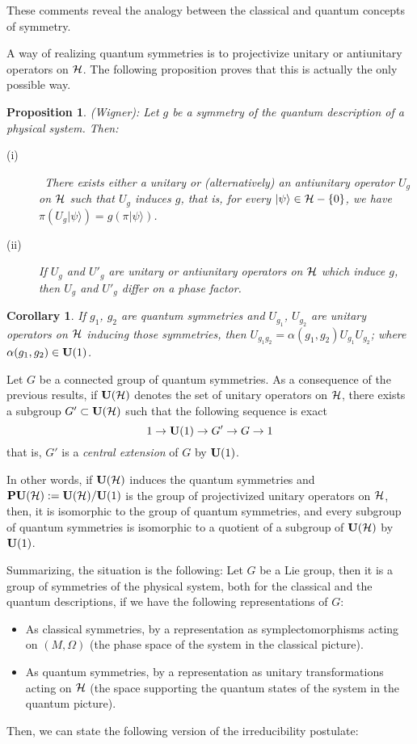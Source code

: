 \documentclass[12pt]{article}
\theoremstyle{plain}
\newtheorem{prop}{Proposition}
\newtheorem{corol}{Corollary}
\def\H{{\cal H}}
\def\sta{|\psi \rangle }
\begin{document}
These comments reveal the analogy between the classical and
quantum concepts of symmetry.

A way of realizing quantum symmetries
is to projectivize unitary or antiunitary operators on $\H$.
The following proposition proves that this is actually the only possible
way.

\begin{prop}
{\rm (Wigner):}
Let $g$ be a symmetry of the quantum description of a physical system.
Then:
\begin{description}
\item[{\rm (i)}] \
There exists either a unitary or (alternatively) an antiunitary
operator $U_g$ on $\H$ such that $U_g$ induces $g$, that is, for
every $\sta \in \H -\{ 0 \}$, we have $\pi(U_g\sta ) = g(\pi \sta
)$.
\item[{\rm (ii)}]
If $U_g$ and $U'_g$ are unitary or antiunitary operators
on $\H$ which induce $g$, then $U_g$ and $U'_g$ differ on a phase
factor.
\end{description}
\label{sg}
\end{prop}

\begin{corol}
If $g_1$, $g_2$ are quantum symmetries and
$U_{g_1}$, $U_{g_2}$ are unitary operators on $\H$
inducing those symmetries, then
$U_{g_1g_2}=\alpha (g_1,g_2)U_{g_1}U_{g_2}$;
where $\alpha (g_1,g_2) \in {\bf U}(1)$.
\end{corol}

Let $G$ be a connected group of quantum symmetries.
As a consequence of the previous results, if ${\bf U}(\H )$ denotes
the set of unitary operators on $\H$, there exists a subgroup
$G'\subset {\bf U}(\H )$ such that the following sequence is exact
$$
1 \to {\bf U}(1) \to G' \to G \to 1
$$
that is, $G'$ is a {\it central extension} of $G$ by ${\bf U}(1)$.

In other words, if ${\bf U}(\H )$ induces the quantum symmetries
and ${\bf PU}(\H ):={\bf U}(\H )/{\bf U}(1)$ is the group of
projectivized
unitary operators on $\H$, then, it is isomorphic to the group of
quantum symmetries, and every subgroup of quantum symmetries
is isomorphic to a quotient of a subgroup of ${\bf U}(\H )$ by ${\bf
U}(1)$.

Summarizing, the situation is the following:
Let $G$ be a Lie group, then it is a group of symmetries of the
physical system, both for the classical and the quantum descriptions,
if we have the following representations of $G$:
\begin{itemize}
\item
As classical symmetries, by a representation as symplectomorphisms
acting on $(M,\Omega )$ (the phase space of the system in the classical
picture).
\item
As quantum symmetries, by a representation as unitary transformations
acting on $\H$
(the space supporting the quantum states of the system in the quantum
picture).
\end{itemize}
Then, we can state the following version of the
irreducibility postulate:
\end{document}
